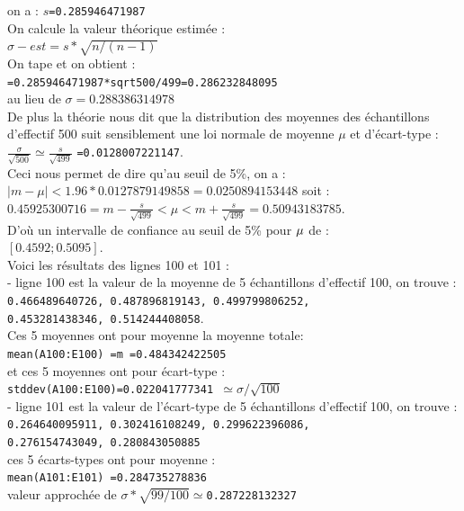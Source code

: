\documentclass[a4paper,11pt]{book}
\begin{document}
 on a : $s${\tt =0.285946471987}\\
On calcule la valeur th\'eorique estim\'ee :\\
$\sigma-est=s*\sqrt{n/(n-1)}$\\
On tape et on obtient :\\
{\tt=0.285946471987*sqrt500/499=0.286232848095}\\
au lieu de  $\sigma=0.288386314978$\\
De plus la th\'eorie nous dit que la distribution des moyennes des
 \'echantillons d'effectif 500 suit sensiblement une loi normale de moyenne 
$\mu$ et 
d'\'ecart-type :\\
$\displaystyle \frac{\sigma}{\sqrt{500}}\simeq\frac{s}{\sqrt{499}}$
{\tt =0.0128007221147}.\\
 Ceci nous permet de dire qu'au seuil de  5\%, on a :\\
$ |m-\mu|<1.96*0.0127879149858=0.0250894153448$ soit :\\
$\displaystyle 0.45925300716=m-\frac{s}{\sqrt{499}}<\mu<m+\frac{s}{\sqrt{499}}=0.50943183785$.\\
D'o\`u un intervalle de confiance au seuil de 5\% pour ${\tt \mu}$ de :\\
$[0.4592;0.5095]$.\\
 Voici  les r\'esultats des lignes 100 et 101 :\\
- ligne 100 est la valeur de la moyenne de 5 \'echantillons d'effectif 100, on 
trouve :\\
{\tt 0.466489640726, 0.487896819143, 0.499799806252,}\\
{\tt  0.453281438346, 0.514244408058}.\\
Ces 5 moyennes ont pour moyenne la moyenne totale:\\
 {\tt mean(A100:E100) =m =0.484342422505}\\
 et ces 5 moyennes ont pour \'ecart-type :\\
 {\tt stddev(A100:E100)=0.022041777341 $\simeq \sigma/\sqrt{100}$}\\
- ligne 101 est la valeur de l'\'ecart-type de 5 \'echantillons d'effectif 100,
 on trouve :\\
{\tt 0.264640095911, 0.302416108249, 0.299622396086,}\\
{\tt 0.276154743049, 0.280843050885}\\
ces 5 \'ecarts-types ont pour moyenne : \\
{\tt mean(A101:E101) =0.284735278836}\\
valeur approch\'ee de  {\tt $\sigma*\sqrt{99/100}\simeq$0.287228132327}\\
\end{document}
